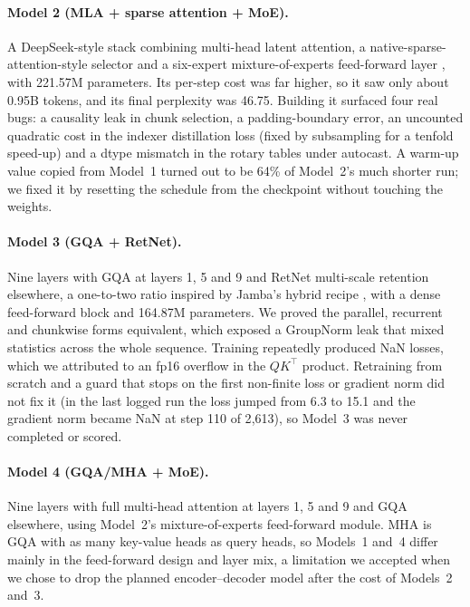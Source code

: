 \documentclass[11pt, oneside]{article}
\begin{document}
\paragraph{Model 2 (MLA + sparse attention + MoE).} A DeepSeek-style stack \cite{deepseek2024v2} combining multi-head latent attention, a native-sparse-attention-style selector \cite{yuan2025nsa} and a six-expert mixture-of-experts feed-forward layer \cite{shazeer2017moe}, with 221.57M parameters. Its per-step cost was far higher, so it saw only about 0.95B tokens, and its final perplexity was 46.75. Building it surfaced four real bugs: a causality leak in chunk selection, a padding-boundary error, an uncounted quadratic cost in the indexer distillation loss (fixed by subsampling for a tenfold speed-up) and a dtype mismatch in the rotary tables under autocast. A warm-up value copied from Model~1 turned out to be 64\% of Model~2's much shorter run; we fixed it by resetting the schedule from the checkpoint without touching the weights.

\paragraph{Model 3 (GQA + RetNet).} Nine layers with GQA at layers 1, 5 and 9 and RetNet multi-scale retention \cite{sun2023retnet} elsewhere, a one-to-two ratio inspired by Jamba's hybrid recipe \cite{lieber2024jamba}, with a dense feed-forward block and 164.87M parameters. We proved the parallel, recurrent and chunkwise forms equivalent, which exposed a GroupNorm leak that mixed statistics across the whole sequence. Training repeatedly produced NaN losses, which we attributed to an fp16 overflow in the $QK^\top$ product. Retraining from scratch and a guard that stops on the first non-finite loss or gradient norm did not fix it (in the last logged run the loss jumped from 6.3 to 15.1 and the gradient norm became NaN at step 110 of 2{,}613), so Model~3 was never completed or scored.

\paragraph{Model 4 (GQA/MHA + MoE).} Nine layers with full multi-head attention at layers 1, 5 and 9 and GQA elsewhere, using Model~2's mixture-of-experts feed-forward module. MHA is GQA with as many key-value heads as query heads, so Models~1 and~4 differ mainly in the feed-forward design and layer mix, a limitation we accepted when we chose to drop the planned encoder--decoder model after the cost of Models~2 and~3.
\end{document}
